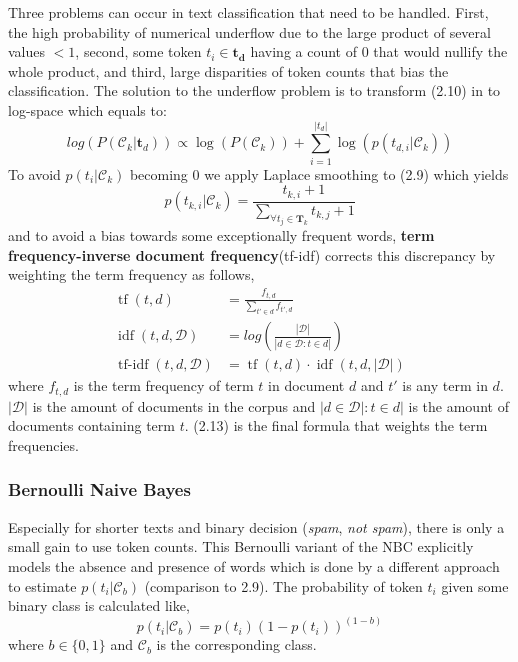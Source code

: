 Three problems can occur in text classification that need to be handled. First, the high probability of numerical underflow due to the large product of several values $<1$, second, some token $t_i \in \boldsymbol{t_d}$ having a count of $0$ that would nullify the whole product, and third, large disparities of token counts that bias the classification. The solution to the underflow problem is to transform (2.10) in to log-space which equals to:
%
\[log(P(\mathcal{C}_k|\boldsymbol{t}_d)) \propto \log(P(\mathcal{C}_k)) + \sum_{i=1}^{|t_{d}|} \log({p(t_{d,i}|\mathcal{C}_k)}) \]
%
To avoid $p({t_{i}}|\mathcal{C}_k)$ becoming $0$ we apply Laplace smoothing to (2.9) which yields
\[ p({t_{k,i}}|\mathcal{C}_k) = \frac{t_{k, i} + 1}{\sum_{\forall t_j \in \boldsymbol{T}_k} t_{k, j} + 1} \]
and to avoid a bias towards some exceptionally frequent words, \textbf{term frequency-inverse document frequency}(\gls{tf-idf}) corrects this discrepancy by weighting the term frequency as follows,
\begin{align}
  \operatorname{tf}(t,d) &= \frac{f_{t,d}}{\sum_{t' \in d} f_{t',d}}\\
  \operatorname{idf}(t,d, \mathcal{D}) &= log\left( \frac{|\mathcal{D}|}{|d \in \mathcal{D}: t \in d|}\right)\\
  \operatorname{tf-idf}(t,d, \mathcal{D}) &= \operatorname{tf}(t,d) \cdot \operatorname{idf}(t,d, |\mathcal{D}|)
\end{align}
where $f_{t,d}$ is the term frequency of term $t$ in document $d$ and $t'$ is any term in $d$. $|\mathcal{D}|$ is the amount of documents in the corpus and $|d \in \mathcal{D}|: t \in d|$ is the amount of documents containing term $t$. (2.13) is the final formula that weights the term frequencies.

\subsubsection{Bernoulli Naive Bayes}
Especially for shorter texts and binary decision (\emph{spam}, \emph{not spam}), there is only a small gain to use token counts. This Bernoulli variant of the NBC explicitly models the absence and presence of words which is done by a different approach to estimate $p(t_{i}|\mathcal{C}_b)$ (comparison to 2.9). The probability of token $t_i$ given some binary class is calculated like,
\[p(t_{i}|\mathcal{C}_b) = p(t_{i})(1-p(t_{i}))^{(1-b)}\]
where $b \in \{0,1\}$ and $\mathcal{C}_b$ is the corresponding class.

